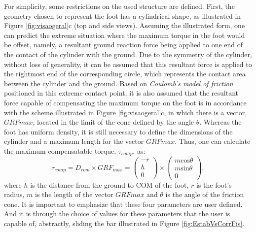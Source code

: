 \documentclass[tog]{acmsiggraph}
\begin{document}
For simplicity, some restrictions on the used structure are defined.
First, the geometry chosen to represent the foot has a cylindrical shape, as illustrated in Figure \ref{fig:visaogeral}c (top and side views).
Assuming the illustrated form, one can predict the extreme situation where the maximum torque in the foot would be offset, namely, 
a resultant ground reaction force being applied to one end of the contact of the cylinder with the ground.
Due to the symmetry of the cylinder, without loss of generality, it can be assumed that this resultant force is applied to the rightmost end of the corresponding circle, which represents the contact area between the cylinder and the ground.
Based on \emph{Coulomb’s model of friction} positioned in this extreme contact point, it is also assumed that the resultant force capable of 
compensating the maximum torque on the foot is in accordance with the scheme illustrated in Figure \ref{fig:visaogeral}c, in which there is
a vector, $GRFmax$, located in the limit of the cone defined by the angle $\theta$. 
Whereas the foot has uniform density, it is still necessary to define the dimensions of the cylinder and a maximum length for the vector $GRFmax$.
Thus, one can calculate the maximum compensatable torque, $\tau_{comp}$, as:
%
\begin{equation}
  \tau_{comp} = D_{com} \times GRF_{max}
              = \left( \begin{array}{c}  -r \\ h \\ 0 \end{array} \right) \times \left( \begin{array}{c}  m\mathrm{cos}\theta \\ m\mathrm{sin}\theta \\ 0 \end{array} \right),
\end{equation}
%
where $h$ is the distance from the ground to COM of the foot, $r$ is the foot's radius, $m$ is the length of the vector $GRFmax$ and $\theta$ is the angle of the friction cone.
%
It is important to emphasize that these four parameters are user defined.
And it is through the choice of values for these parameters that the user is capable of, abstractly, sliding the bar illustrated in Figure \ref{fig:EstabVsCorrFis}.
\end{document}
